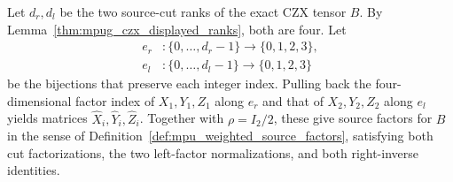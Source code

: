 \begin{definition}
    \label{def:mpug_czx_displayed_source_factors}
    \leanok
    Let $d_r,d_l$ be the two source-cut ranks of the exact CZX tensor $B$.
    By Lemma~\ref{thm:mpug_czx_displayed_ranks}, both are four. Let
    \begin{align}
        e_r & :\{0,\ldots,d_r-1\}\longrightarrow\{0,1,2,3\}, \\
        e_l & :\{0,\ldots,d_l-1\}\longrightarrow\{0,1,2,3\}
    \end{align}
    be the bijections that preserve each integer index. Pulling back the
    four-dimensional factor index of $X_1,Y_1,Z_1$ along $e_r$ and that
    of $X_2,Y_2,Z_2$ along $e_l$ yields matrices
    $\widehat X_i,\widehat Y_i,\widehat Z_i$. Together with $\rho=I_2/2$,
    these give source factors for $B$ in the sense of
    Definition~\ref{def:mpu_weighted_source_factors}, satisfying both cut
    factorizations, the two left-factor normalizations, and both
    right-inverse identities.


\end{definition}
